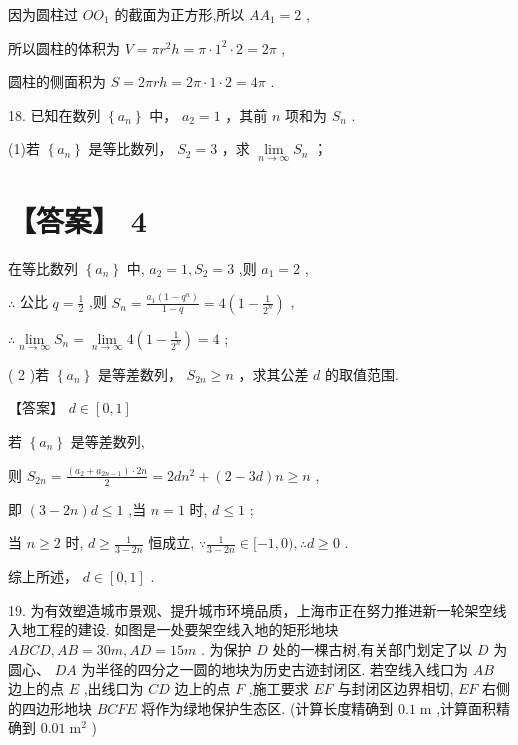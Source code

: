 \documentclass[10pt]{article}
\begin{document}
因为圆柱过 \(O{O}_{1}\) 的截面为正方形,所以 \(A{A}_{1} = 2\) ,

所以圆柱的体积为 \(V = \pi {r}^{2}h = \pi  \cdot  {1}^{2} \cdot  2 = {2\pi }\) ,

圆柱的侧面积为 \(S = {2\pi rh} = {2\pi } \cdot  1 \cdot  2 = {4\pi }\) .

18. 已知在数列 \(\left\{  {a}_{n}\right\}\) 中， \({a}_{2} = 1\) ，其前 \(n\) 项和为 \({S}_{n}\) .

(1)若 \(\left\{  {a}_{n}\right\}\) 是等比数列， \({S}_{2} = 3\) ，求 \(\mathop{\lim }\limits_{{n \rightarrow  \infty }}{S}_{n}\) ；

\section*{【答案】 4}

在等比数列 \(\left\{  {a}_{n}\right\}\) 中, \({a}_{2} = 1,{S}_{2} = 3\) ,则 \({a}_{1} = 2\) ,

\(\therefore\) 公比 \(q = \frac{1}{2}\) ,则 \({S}_{n} = \frac{{a}_{1}\left( {1 - {q}^{n}}\right) }{1 - q} = 4\left( {1 - \frac{1}{{2}^{n}}}\right)\) ,

\(\therefore \mathop{\lim }\limits_{{n \rightarrow  \infty }}{S}_{n} = \mathop{\lim }\limits_{{n \rightarrow  \infty }}4\left( {1 - \frac{1}{{2}^{n}}}\right)  = 4\) ;

( 2 )若 \(\left\{  {a}_{n}\right\}\) 是等差数列， \({S}_{2n} \geq  n\) ，求其公差 \(d\) 的取值范围.

【答案】 \(d \in  \left\lbrack  {0,1}\right\rbrack\)

若 \(\left\{  {a}_{n}\right\}\) 是等差数列,

则 \({S}_{2n} = \frac{\left( {{a}_{2} + {a}_{{2n} - 1}}\right)  \cdot  {2n}}{2} = {2d}{n}^{2} + \left( {2 - {3d}}\right) n \geq  n\) ,

即 \(\left( {3 - {2n}}\right) d \leq  1\) ,当 \(n = 1\) 时, \(d \leq  1\) ;

当 \(n \geq  2\) 时, \(d \geq  \frac{1}{3 - {2n}}\) 恒成立, \(\because \frac{1}{3 - {2n}} \in  \lbrack  - 1,0),\therefore d \geq  0\) .

综上所述， \(d \in  \left\lbrack  {0,1}\right\rbrack\) .

19. 为有效塑造城市景观、提升城市环境品质，上海市正在努力推进新一轮架空线入地工程的建设. 如图是一处要架空线入地的矩形地块 \({ABCD},{AB} = {30m},{AD} = {15m}\) . 为保护 \(D\) 处的一棵古树,有关部门划定了以 \(D\) 为圆心、 \({DA}\) 为半径的四分之一圆的地块为历史古迹封闭区. 若空线入线口为 \({AB}\) 边上的点 \(E\) ,出线口为 \({CD}\) 边上的点 \(F\) ,施工要求 \({EF}\) 与封闭区边界相切, \({EF}\) 右侧的四边形地块 \({BCFE}\) 将作为绿地保护生态区. (计算长度精确到 \({0.1}\mathrm{\;m}\) ,计算面积精确到 \({0.01}{\mathrm{\;m}}^{2}\) )
\end{document}
